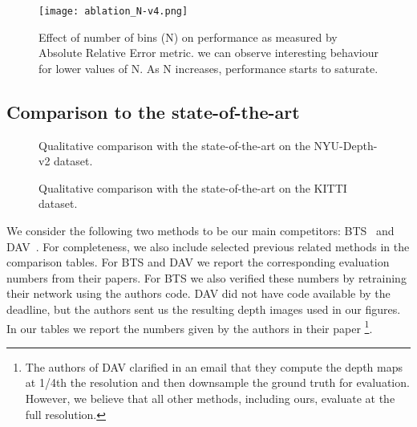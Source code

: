 \documentclass[final]{cvpr}
\begin{document}
\begin{figure}[t]
    \centering
    \texttt{[image: ablation\_N-v4.png]}
    \caption{Effect of number of bins (N) on performance as measured by Absolute Relative Error metric. we can observe interesting behaviour for lower values of N. As N increases, performance starts to saturate.}
    \label{fig:ablation-N}
\end{figure}

\subsection{Comparison to the state-of-the-art}

\begin{figure*}
     \centering
     \hspace{0.3em}\hspace{0.3em}\hspace{0.3em}\hspace{0.3em}
        \caption{Qualitative comparison with the state-of-the-art on the NYU-Depth-v2 dataset.}
        \label{fig:qualitative-comparison}
\end{figure*}

\begin{figure*}
     \centering
     \hspace{0.3em}\hspace{0.3em}\hspace{0.3em}\caption{Qualitative comparison with the state-of-the-art on the KITTI dataset.}
        \label{fig:qualitative-comparison-kitti}
\end{figure*}

We consider the following two methods to be our main competitors: BTS~\cite{bts_lee2019big} and DAV~\cite{dav_huynh2020guiding}.  
For completeness, we also include selected previous related methods in the comparison tables.
For BTS and DAV we report the corresponding evaluation numbers from their papers. For BTS we also verified these numbers by retraining their network using the authors code. DAV did not have code available by the deadline, but the authors sent us the resulting depth images used in our figures. In our tables we report the numbers given by the authors in their paper \footnote{The authors of DAV clarified in an email that they compute the depth maps at 1/4th the resolution and then downsample the ground truth for evaluation. However, we believe that all other methods, including ours, evaluate at the full resolution.}.
\end{document}
